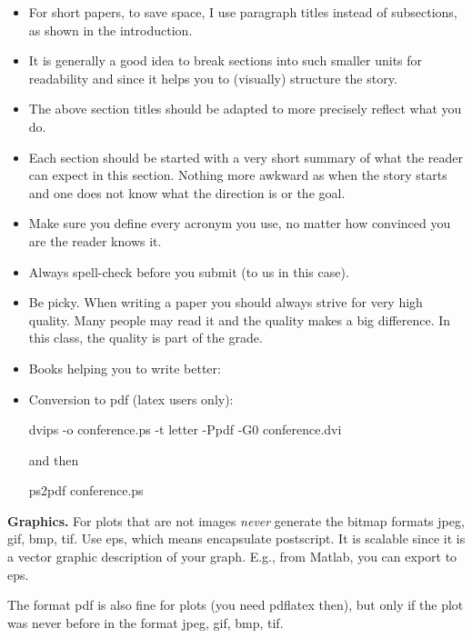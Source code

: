 \documentclass[letterpaper]{article}
\newcommand{\mypar}[1]{{\bf #1.}}
\begin{document}
\begin{itemize}
\item For short papers, to save space, I use paragraph titles instead of
subsections, as shown in the introduction.

\item It is generally a good idea to break sections into such smaller
units for readability and since it helps you to (visually) structure the story.

\item The above section titles should be adapted to more precisely
reflect what you do.

\item Each section should be started with a very
short summary of what the reader can expect in this section. Nothing
more awkward as when the story starts and one does not know what the
direction is or the goal.

\item Make sure you define every acronym you use, no matter how
convinced you are the reader knows it.

\item Always spell-check before you submit (to us in this case).

\item Be picky. When writing a paper you should always strive for very
high quality. Many people may read it and the quality makes a big difference.
In this class, the quality is part of the grade.

\item Books helping you to write better:

\item Conversion to pdf (latex users only): 

dvips -o conference.ps -t letter -Ppdf -G0 conference.dvi

and then

ps2pdf conference.ps
\end{itemize}

\mypar{Graphics} For plots that are not images {\em never} generate the bitmap formats
jpeg, gif, bmp, tif. Use eps, which means encapsulate postscript. It is
scalable since it is a vector graphic description of your graph. E.g.,
from Matlab, you can export to eps.

The format pdf is also fine for plots (you need pdflatex then), but only if the plot was never before in the format 
jpeg, gif, bmp, tif.







\end{document}
